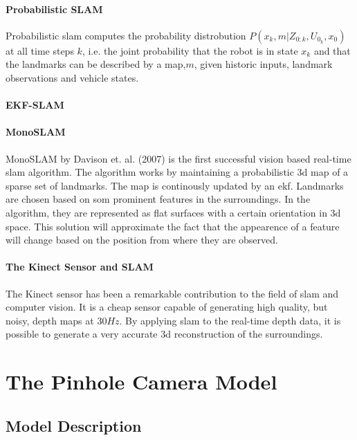 \paragraph{Probabilistic SLAM}
Probabilistic \gls{slam} computes the probability distrobution $P(x_k,m|Z_{0:k},U_{0_k},x_0)$ at all time steps $k$\cite{SLAMp1}, i.e. the joint probability that the robot is in state \boldmath$x_k$ and that the landmarks can be described by a map,\boldmath$m$, given historic inputs, landmark observations and vehicle states.

\paragraph{EKF-SLAM}

\paragraph{MonoSLAM}

MonoSLAM by Davison et. al. (2007) is the first successful vision based real-time \gls{slam} algorithm\cite{monoSLAM}. The algorithm works by maintaining a probabilistic 3d map of a sparse set of landmarks. The map is continously updated by an \gls{ekf}. Landmarks are chosen based on som prominent features in the surroundings. In the algorithm, they are represented as flat surfaces with a certain orientation in 3d space. This solution will approximate the fact that the appearence of a feature will change based on the position from where they are observed.

\paragraph{The Kinect Sensor and SLAM}

The Kinect sensor has been a remarkable contribution to the field of \gls{slam} and computer vision. It is a cheap sensor capable of generating high quality, but noisy, depth maps at $30 Hz$. By applying \gls{slam} to the real-time depth data, it is possible to generate a very accurate 3d reconstruction of the surroundings.


\section{The Pinhole Camera Model}

\subsection{Model Description}

